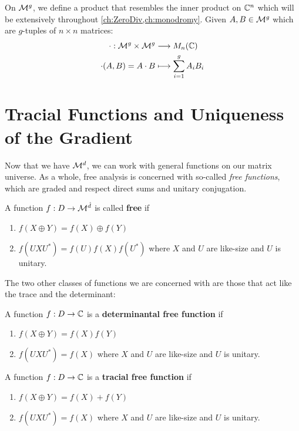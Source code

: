 On \(\mathcal{M}^{g} \), we define a product that resembles the inner product on
\(\mathbb{C}^n\) which will be extensively throughout \cref{ch:ZeroDiv,ch:monodromy}.
Given \(A,B \in \mathcal{M}^{g} \) which are \(g\)-tuples of \(n \times n\) matrices:
\begin{align*}
	\cdot : \mathcal{M}^{g} \times \mathcal{M}^{g}  &\longrightarrow M_n(\mathbb{C}) \\
  \cdot (A,B) = A \cdot B &\longmapsto \sum_{i=1}^g A_i B_i
\end{align*}



\section{Tracial Functions and Uniqueness of the Gradient}%
\label{sec:TracGrad}
Now that we have \(\mathcal{M}^d\), we can work with general functions on our matrix
universe. As a whole, free analysis is concerned with so-called \emph{free
  functions}, which are graded and
respect direct sums and unitary conjugation.

\begin{definition}
\label{def:FreeFun}
  A function \(f: D\to \mathcal{M}^{\hat{d}}\) is called \textbf{free} if
  \begin{enumerate}
    \item \(f(X\oplus Y)= f(X) \oplus f(Y)\)
    \item \(f(U X U^*) = f(U)f(X)f(U^*)\) where \(X\) and \(U\) are like-size
          and \(U\) is unitary.
  \end{enumerate}
\end{definition}

The two other classes of functions we are concerned with are those that act like
the trace and the determinant:
\begin{definition}%
\label{def:DetFreeFun}
  A function \(f: D \to \mathbb{C} \) is a \textbf{determinantal free function} if
  \begin{enumerate}
    \item \(f(X\oplus Y) = f(X)f(Y)\)
    \item \(f(U X U^*) = f(X)\) where \(X\) and \(U\) are like-size
          and \(U\) is unitary.
  \end{enumerate}
\end{definition}

\begin{definition}%
\label{def:TrFreeFun}
  A function \(f: D \to \mathbb{C} \) is a \textbf{tracial free function} if
  \begin{enumerate}
    \item \(f(X\oplus Y) = f(X)+f(Y)\)
    \item \(f(U X U^*) = f(X)\) where \(X\) and \(U\) are like-size
          and \(U\) is unitary.
  \end{enumerate}
\end{definition}

